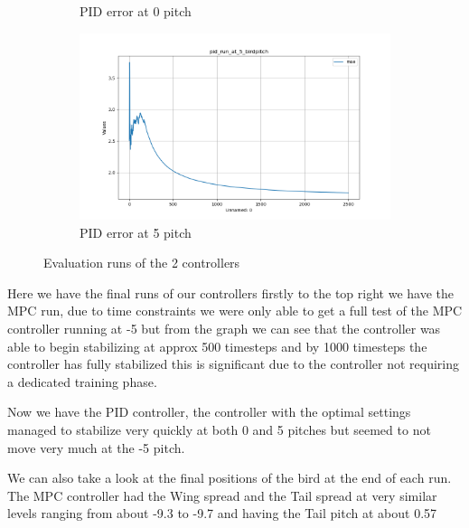 \begin{figure}[h!]
\begin{subfigure}[b]{0.49\textwidth}
        \caption{PID error at 0\textdegree{} pitch}
    \end{subfigure}
    \begin{subfigure}[b]{0.49\textwidth}
        \centering
        \includegraphics[width=\textwidth]{./Resources/pid_run_at_5_birdpitch.png}
        \caption{PID error at 5\textdegree{} pitch}
    \end{subfigure}
    \caption{Evaluation runs of the 2 controllers}
    \label{fig:four_images}
\end{figure}


    Here we have the final runs of our controllers firstly to the top right
    we have the MPC run, due to time constraints we were only able to get a
    full test of the MPC controller running at -5\textdegree{} but from the
    graph we can see that the controller was able to begin stabilizing at
    approx 500 timesteps and by 1000 timesteps the controller has fully
    stabilized this is significant due to the controller not requiring a
    dedicated training phase.


    Now we have the PID controller, the controller with the optimal
    settings managed to stabilize very quickly at both 0\textdegree{}
    and 5\textdegree{} pitches but seemed to not move very much at the
    -5\textdegree{} pitch.


    We can also take a look at the final positions of the bird at the
    end of each run. The MPC controller had the Wing spread and the Tail
    spread at very similar levels ranging from about -9.3 to -9.7 and having
    the Tail pitch at about 0.57

